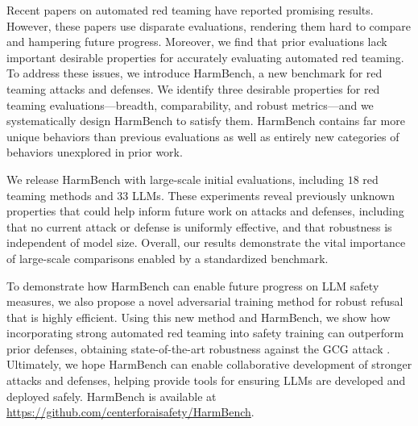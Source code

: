 Recent papers on automated red teaming have reported promising results. However, these papers use disparate evaluations, rendering them hard to compare and hampering future progress. Moreover, we find that prior evaluations lack important desirable properties for accurately evaluating automated red teaming. To address these issues, we introduce HarmBench, a new benchmark for red teaming attacks and defenses. We identify three desirable properties for red teaming evaluations---breadth, comparability, and robust metrics---and we systematically design HarmBench to satisfy them. HarmBench contains far more unique behaviors than previous evaluations as well as entirely new categories of behaviors unexplored in prior work.

We release HarmBench with large-scale initial evaluations, including $18$ red teaming methods and $33$ LLMs. These experiments reveal previously unknown properties that could help inform future work on attacks and defenses, including that no current attack or defense is uniformly effective, and that robustness is independent of model size. Overall, our results demonstrate the vital importance of large-scale comparisons enabled by a standardized benchmark.

To demonstrate how HarmBench can enable future progress on LLM safety measures, we also propose a novel adversarial training method for robust refusal that is highly efficient. Using this new method and HarmBench, we show how incorporating strong automated red teaming into safety training can outperform prior defenses, obtaining state-of-the-art robustness against the GCG attack \citep{zou2023universal}. Ultimately, we hope HarmBench can enable collaborative development of stronger attacks and defenses, helping provide tools for ensuring LLMs are developed and deployed safely. HarmBench is available at \url{https://github.com/centerforaisafety/HarmBench}.








